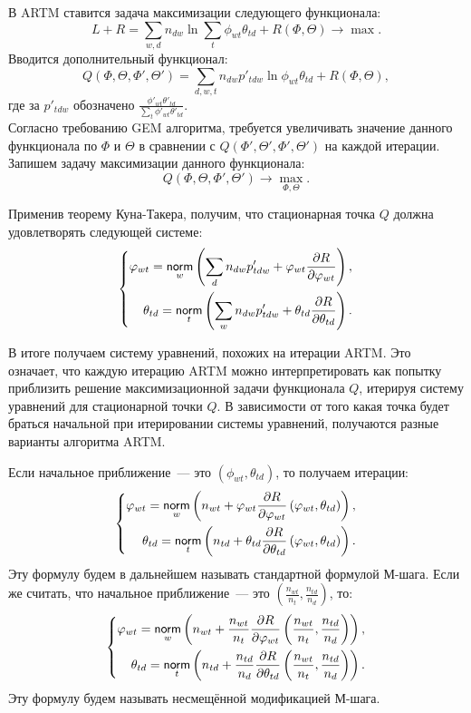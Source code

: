 \documentclass[12pt, twoside]{article}
\begin{document}
В ARTM ставится задача максимизации следующего функционала:
\[
L + R = \sum_{w,d} n_{dw} \ln\sum_t \phi_{wt} \theta_{td} +  R(\Phi, \Theta) \to \max.
\]
Вводится дополнительный функционал:
\[
	Q(\Phi, \Theta, \Phi', \Theta') = \sum\limits_{d, w, t} n_{dw} p'_{tdw} \ln{\phi_{wt}\theta_{td}} + R(\Phi, \Theta),
\]
где за $p'_{tdw}$ обозначено $\frac{\phi'_{wt} \theta'_{td}}{\sum\limits_t \phi'_{wt} \theta'_{td}}$.\\

Согласно требованию GEM алгоритма, требуется увеличивать значение данного функционала по $\Phi$ и $\Theta$ в сравнении с $Q(\Phi', \Theta', \Phi', \Theta')$ на каждой итерации. Запишем задачу максимизации данного функционала:
\[
Q(\Phi, \Theta, \Phi', \Theta') \to \max_{\Phi, \Theta}.
\]

Применив теорему Куна-Такера,  получим, что стационарная точка $Q$ должна удовлетворять следующей системе:
\[
\left\{
	\begin{aligned}
		\varphi_{wt}= \mathop{\mathsf{norm}}\limits_w \left( \sum\limits_d n_{dw} p'_{tdw} + \varphi_{wt} \frac{\partial{R}}{\partial{\varphi_{wt}}} \right),\\
		\theta_{td} = \mathop{\mathsf{norm}}\limits_t \left( \sum\limits_w n_{dw} p'_{tdw} + \theta_{td} \frac{\partial{R}}{\partial{\theta_{td}}} \right).
	\end{aligned}
\right.
\]

В итоге получаем систему уравнений, похожих на итерации ARTM. Это означает, что каждую итерацию ARTM можно интерпретировать как попытку приблизить решение максимизационной задачи функционала $Q$, итерируя систему уравнений для стационарной точки $Q$. В зависимости от того какая точка будет браться начальной при итерировании системы уравнений, получаются разные варианты алгоритма ARTM.

Если начальное приближение~--- это $(\phi_{wt}, \theta_{td})$, то получаем итерации:
\[
\left\{
	\begin{aligned}
		\varphi_{wt} = \mathop{\mathsf{norm}}\limits_w \left( n_{wt} + \varphi_{wt} \frac{\partial{R}}{\partial{\varphi_{wt}}} \left( \varphi_{wt}, \theta_{td}\right) \right),\\
		\theta_{td} = \mathop{\mathsf{norm}}\limits_t \left( n_{td} + \theta_{td} \frac{\partial{R}}{\partial{\theta_{td}}} \left( \varphi_{wt}, \theta_{td}\right) \right).
	\end{aligned}
\right.
\]
Эту формулу будем в дальнейшем называть стандартной формулой М-шага. Если же считать, что начальное приближение~---  это $\left(\frac{n_{wt}}{n_t}, \frac{n_{td}}{n_d}\right)$, то:
\[
\left\{
	\begin{aligned}
		\varphi_{wt}= \mathop{\mathsf{norm}}\limits_w \left( n_{wt} + \frac{n_{wt}}{n_t} \frac{\partial{R}}{\partial{\varphi_{wt}}} \left(\frac{n_{wt}}{n_t}, \frac{n_{td}}{n_d}\right) \right),\\
		\theta_{td} = \mathop{\mathsf{norm}}\limits_t \left(n_{td} + \frac{n_{td}}{n_d} \frac{\partial{R}}{\partial{\theta_{td}}} \left(\frac{n_{wt}}{n_t}, \frac{n_{td}}{n_d}\right) \right).
	\end{aligned}
\right.
\]
Эту формулу будем называть несмещённой модификацией М-шага.
\end{document}
